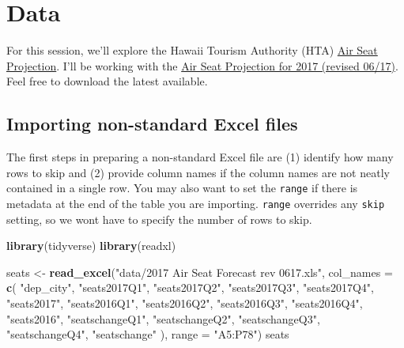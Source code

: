 \documentclass[]{book}
\newenvironment{Shaded}{\begin{snugshade}}{\end{snugshade}}
\newcommand{\KeywordTok}[1]{\textcolor[rgb]{0.13,0.29,0.53}{\textbf{{#1}}}}
\newcommand{\DataTypeTok}[1]{\textcolor[rgb]{0.13,0.29,0.53}{{#1}}}
\newcommand{\StringTok}[1]{\textcolor[rgb]{0.31,0.60,0.02}{{#1}}}
\newcommand{\NormalTok}[1]{{#1}}
\theoremstyle{definition}
\theoremstyle{definition}
\theoremstyle{remark}
\begin{document}
\section{Data}\label{data}

For this session, we'll explore the Hawaii Tourism Authority (HTA)
\href{http://www.hawaiitourismauthority.org/research/research/infrastructure-research/}{Air
Seat Projection}. I'll be working with the
\href{http://www.hawaiitourismauthority.org/default/assets/File/2017\%20Air\%20Seat\%20Forecast\%20rev\%200617.xls}{Air
Seat Projection for 2017 (revised 06/17)}. Feel free to download the
latest available.

\subsection{Importing non-standard Excel
files}\label{importing-non-standard-excel-files}

The first steps in preparing a non-standard Excel file are (1) identify
how many rows to skip and (2) provide column names if the column names
are not neatly contained in a single row. You may also want to set the
\texttt{range} if there is metadata at the end of the table you are
importing. \texttt{range} overrides any \texttt{skip} setting, so we
wont have to specify the number of rows to skip.

\begin{Shaded}
\begin{Highlighting}[]
\KeywordTok{library}\NormalTok{(tidyverse)}
\KeywordTok{library}\NormalTok{(readxl)}
\end{Highlighting}
\end{Shaded}

\begin{Shaded}
\begin{Highlighting}[]
\NormalTok{seats <-}\StringTok{ }\KeywordTok{read_excel}\NormalTok{(}\StringTok{"data/2017 Air Seat Forecast rev 0617.xls"}\NormalTok{, }\DataTypeTok{col_names =} \KeywordTok{c}\NormalTok{(}
  \StringTok{"dep_city"}\NormalTok{, }
  \StringTok{"seats2017Q1"}\NormalTok{, }\StringTok{"seats2017Q2"}\NormalTok{, }\StringTok{"seats2017Q3"}\NormalTok{, }\StringTok{"seats2017Q4"}\NormalTok{, }\StringTok{"seats2017"}\NormalTok{, }
  \StringTok{"seats2016Q1"}\NormalTok{, }\StringTok{"seats2016Q2"}\NormalTok{, }\StringTok{"seats2016Q3"}\NormalTok{, }\StringTok{"seats2016Q4"}\NormalTok{, }\StringTok{"seats2016"}\NormalTok{,}
  \StringTok{"seatschangeQ1"}\NormalTok{, }\StringTok{"seatschangeQ2"}\NormalTok{, }\StringTok{"seatschangeQ3"}\NormalTok{, }\StringTok{"seatschangeQ4"}\NormalTok{, }\StringTok{"seatschange"}
\NormalTok{), }\DataTypeTok{range =} \StringTok{"A5:P78"}\NormalTok{)}
\NormalTok{seats}
\end{Highlighting}
\end{Shaded}
\end{document}
